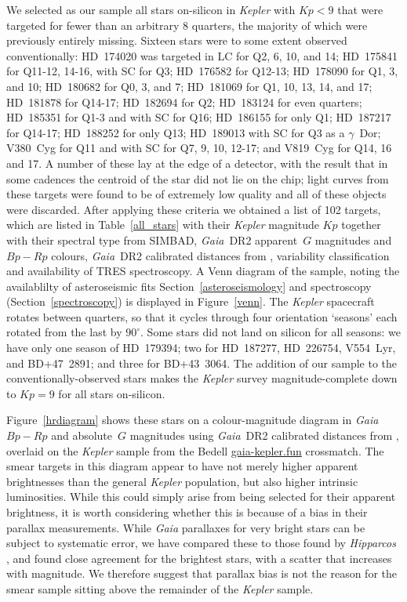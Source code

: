 \documentclass[a4paper,fleqn,usenatbib]{mnras}
\newcommand{\kepler}{\emph{Kepler}\xspace}
\newcommand{\gaia}{\emph{Gaia}\xspace}
\begin{document}
We selected as our sample all stars on-silicon in \kepler with $Kp<9$ that were targeted for fewer than an arbitrary $8$ quarters, the majority of which were previously entirely missing. Sixteen stars were to some extent observed conventionally: HD~174020 was targeted in LC for Q2, 6, 10, and 14; HD~175841 for Q11-12, 14-16, with SC for Q3; HD~176582 for Q12-13; HD~178090 for Q1, 3, and 10; HD~180682 for Q0, 3, and 7; HD~181069 for Q1, 10, 13, 14, and 17; HD~181878 for Q14-17; HD~182694 for Q2; HD~183124 for even quarters; HD~185351 for Q1-3 and with SC for Q16; HD~186155 for only Q1; HD~187217 for Q14-17; HD~188252 for only Q13; HD~189013 with SC for Q3 as a $\gamma$~Dor; V380~Cyg for Q11 and with SC for Q7, 9, 10, 12-17; and V819~Cyg for Q14, 16 and 17. A number of these lay at the edge of a detector, with the result that in some cadences the centroid of the star did not lie on the chip; light curves from these targets were found to be of extremely low quality and all of these objects were discarded. After applying these criteria we obtained a list of 102 targets, which are listed in Table~\ref{all_stars} with their \kepler magnitude $Kp$ together with their spectral type from SIMBAD, \gaia~DR2 apparent~$G$ magnitudes and $Bp-Rp$ colours, \gaia~DR2 calibrated distances from \citet{gaiadists}, variability classification and availability of TRES spectroscopy. A Venn diagram of the sample, noting the availablilty of asteroseismic fits Section~\ref{asteroseismology} and spectroscopy (Section~\ref{spectroscopy}) is displayed in Figure~\ref{venn}. The \kepler spacecraft rotates between quarters, so that it cycles through four orientation `seasons' each rotated from the last by $90^{\circ}$. Some stars did not land on silicon for all seasons: we have only one season of HD~179394; two for HD~187277, HD~226754, V554~Lyr, and BD+47~2891; and three for BD+43~3064. The addition of our sample to the conventionally-observed stars makes the \kepler survey magnitude-complete down to $Kp=9$ for all stars on-silicon.

Figure~\ref{hrdiagram} shows these stars on a colour-magnitude diagram in \gaia $Bp-Rp$ and absolute~$G$ magnitudes using \gaia~DR2 calibrated distances from \citet{gaiadists}, overlaid on the \kepler sample from the Bedell \url{gaia-kepler.fun} crossmatch. The smear targets in this diagram appear to have not merely higher apparent brightnesses than the general \kepler population, but also higher intrinsic luminosities. While this could simply arise from being selected for their apparent brightness, it is {}worth considering whether this is because of a bias in their parallax measurements. While \gaia parallaxes for very bright stars can be subject to systematic error, we have compared these to those found by \emph{Hipparcos} \citep{vanleeuwen07b}, and found close agreement for the brightest stars, with a scatter that increases with magnitude. We therefore suggest that parallax bias is not the reason for the smear sample sitting above the remainder of the \kepler sample.
\end{document}
